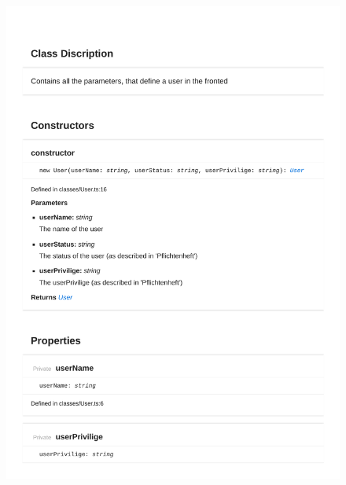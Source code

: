 \begin{figure}[H]
\centerline{\includegraphics[width=1\textwidth]{FrontendDocsAsPDF/Classes/User.pdf}}
\end{figure}

